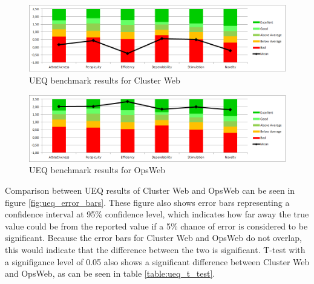 \begin{figure}[ht]
  \begin{center}
    \includegraphics*[width=1\textwidth]{cw_ueq}
  \end{center}
  \caption{UEQ benchmark results for Cluster Web}
  \label{fig:cw_ueq}
\end{figure}

\begin{figure}[ht]
  \begin{center}
    \includegraphics*[width=1\textwidth]{ow_ueq}
  \end{center}
  \caption{UEQ benchmark results for OpsWeb}
  \label{fig:ow_ueq}
\end{figure}

Comparison between UEQ results of Cluster Web and OpsWeb can be seen in figure \ref{fig:ueq_error_bars}. These figure also shows error bars representing a confidence interval at 95\% confidence level, which indicates how far away the true value could be from the reported value if a 5\% chance of error is considered to be significant. Because the error bars for Cluster Web and OpsWeb do not overlap, this would indicate that the difference between the two is significant. T-test with a signifigance level of 0.05 also shows a significant difference between Cluster Web and OpsWeb, as can be seen in table \ref{table:ueq_t_test}.


